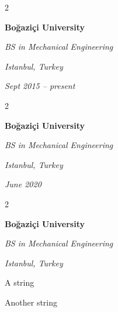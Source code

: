 \documentclass[10pt, letterpaper]{article}
\newenvironment{summary}{
    \begin{description}[
        topsep=0.10 cm,
        parsep=0.10 cm,
        partopsep=0pt,
        itemsep=0pt,
        leftmargin=0.4 cm + 10pt
    ]
}{
    \end{description}
} %
\newenvironment{twocolentry}[2][]{
    \onecolentry
    \def\secondColumn{#2}
    \setcolumnwidth{\fill, 4.5 cm}
    \begin{paracol}{2}
}{
    \switchcolumn \raggedleft \secondColumn
    \end{paracol}
    \endonecolentry
} %
\begin{document}
        \vspace{0.2 cm}

        \begin{twocolentry}{
        \textit{Istanbul, Turkey}    
            
        \textit{Sept 2015 – present}}
            \textbf{Boğaziçi University}

            \textit{BS in Mechanical Engineering}
        \end{twocolentry}


        \vspace{0.2 cm}

        \begin{twocolentry}{
        \textit{Istanbul, Turkey}    
            
        \textit{June 2020}}
            \textbf{Boğaziçi University}

            \textit{BS in Mechanical Engineering}
        \end{twocolentry}


        \vspace{0.2 cm}

        \begin{twocolentry}{
        \textit{Istanbul, Turkey}    
            
        }
            \textbf{Boğaziçi University}

            \textit{BS in Mechanical Engineering}
        \end{twocolentry}
            \begin{summary}
                \item A string
                \item Another string
            \end{summary}


        \vspace{0.2 cm}
\end{document}
